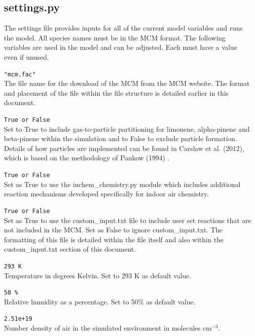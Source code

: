 \documentclass[a4paper]{refart}
\begin{document}
\subsection{settings.py}\label{settings.py}
The settings file provides inputs for all of the current model variables and runs the model. All species names must be in the MCM format. The following variables are used in the model and can be adjusted. Each must have a value even if unused.

\texttt{"mcm.fac"}\\ 
The file name for the download of the MCM from the MCM website. The format and placement of the file within the file structure is detailed earlier in this document. 

\label{particles}
\texttt{True or False}\\
Set to True to include gas-to-particle partitioning for limonene, alpha-pinene and beta-pinene within the simulation and to False to exclude particle formation. Details of how particles are implemented can be found in Carslaw et al. (2012), which is based on the methodology of Pankow (1994) \cite{Carslaw2012,Pankow1994}.

\texttt{True or False}\\
Set as True to use the inchem\_chemistry.py module which includes additional reaction mechanisms developed specifically for indoor air chemistry. 

\texttt{True or False}\\
Set as True to use the custom\_input.txt file to include user set reactions that are not included in the MCM. Set as False to ignore custom\_input.txt. The formatting of this file is detailed within the file itself and also within the  custom\_input.txt section of this document.

\texttt{293 K}\\
Temperature in degrees Kelvin. Set to 293 K as default value.

\texttt{50 \%}\\
Relative humidity as a percentage. Set to 50\% as default value.

\texttt{2.51e+19}\\
Number density of air in the simulated environment in molecules cm$^{-3}$.
\end{document}
